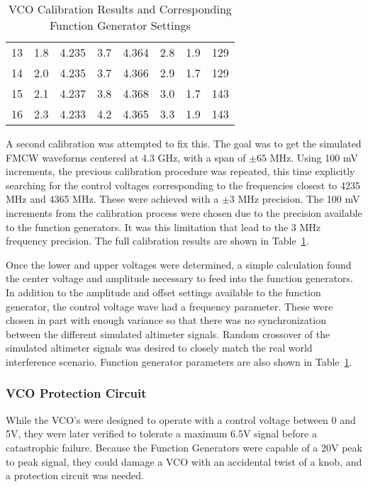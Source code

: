 \begin{table}[]
\begin{tabular}{@{}c|cc|cc|ccc@{}}
13  & 1.8      & 4.235           & 3.7      & 4.364           & 2.8             & 1.9                & 129                    \\
14  & 2.0      & 4.235           & 3.7      & 4.366           & 2.9             & 1.7                & 129                    \\
15  & 2.1      & 4.237           & 3.8      & 4.368           & 3.0             & 1.7                & 143                    \\
16  & 2.3      & 4.233           & 4.2      & 4.365           & 3.3             & 1.9                & 143                   
\end{tabular}
\caption{VCO Calibration Results and Corresponding Function Generator Settings}
\label{tab:VCO_Cal}
\end{table}


A second calibration was attempted to fix this. The goal was to get the simulated FMCW waveforms centered at 4.3 GHz, with a span of $\pm65$ MHz. Using 100 mV increments, the previous calibration procedure was repeated, this time explicitly searching for the control voltages corresponding to the frequencies closest to 4235 MHz and 4365 MHz. These were achieved with a $\pm3$ MHz precision. The 100 mV increments from the calibration process were chosen due to the precision available to the function generators. It was this limitation that lead to the 3 MHz frequency precision. The full calibration results are shown in Table~\ref{tab:VCO_Cal}.

Once the lower and upper voltages were determined, a simple calculation found the center voltage and amplitude necessary to feed into the function generators. In addition to the amplitude and offset settings available to the function generator, the control voltage wave had a frequency parameter. These were chosen in part with enough variance so that there was no synchronization between the different simulated altimeter signals. Random crossover of the simulated altimeter signals was desired to closely match the real world interference scenario. Function generator parameters are also shown in Table~\ref{tab:VCO_Cal}.

\subsubsection{VCO Protection Circuit}
While the VCO's were designed to operate with a control voltage between 0 and 5V, they were later verified to tolerate a maximum 6.5V signal before a catastrophic failure. Because the Function Generators were capable of a 20V peak to peak signal, they could damage a VCO with an accidental twist of a knob, and a protection circuit was needed.

